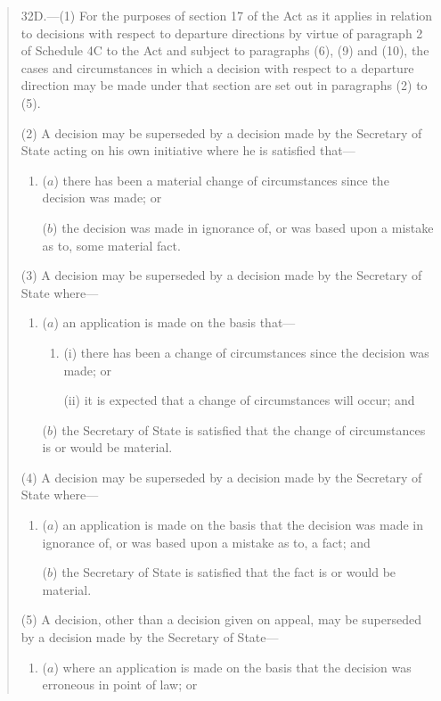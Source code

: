 \documentclass[12pt,a4paper]{article}
\begin{document}
\begin{quotation}
32D.—(1) For the purposes of section 17 of the Act as it applies in relation to decisions with respect to departure directions by virtue of paragraph 2 of Schedule 4C to the Act and subject to paragraphs (6), (9) and (10), the cases and circumstances in which a decision with respect to a departure direction may be made under that section are set out in paragraphs (2) to (5).

(2) A decision may be superseded by a decision made by the Secretary of State acting on his own initiative where he is satisfied that---
\begin{enumerate}\item[]
($a$) there has been a material change of circumstances since the decision was made; or

($b$) the decision was made in ignorance of, or was based upon a mistake as to, some material fact.
\end{enumerate}

(3) A decision may be superseded by a decision made by the Secretary of State where---
\begin{enumerate}\item[]
($a$) an application is made on the basis that---
\begin{enumerate}\item[]
(i) there has been a change of circumstances since the decision was made; or

(ii) it is expected that a change of circumstances will occur; and
\end{enumerate}

($b$) the Secretary of State is satisfied that the change of circumstances is or would be material.
\end{enumerate}

(4) A decision may be superseded by a decision made by the Secretary of State where---
\begin{enumerate}\item[]
($a$) an application is made on the basis that the decision was made in ignorance of, or was based upon a mistake as to, a fact; and

($b$) the Secretary of State is satisfied that the fact is or would be material.
\end{enumerate}

(5) A decision, other than a decision given on appeal, may be superseded by a decision made by the Secretary of State---
\begin{enumerate}\item[]
($a$) where an application is made on the basis that the decision was erroneous in point of law; or


\end{enumerate}
\end{quotation}
\end{document}
